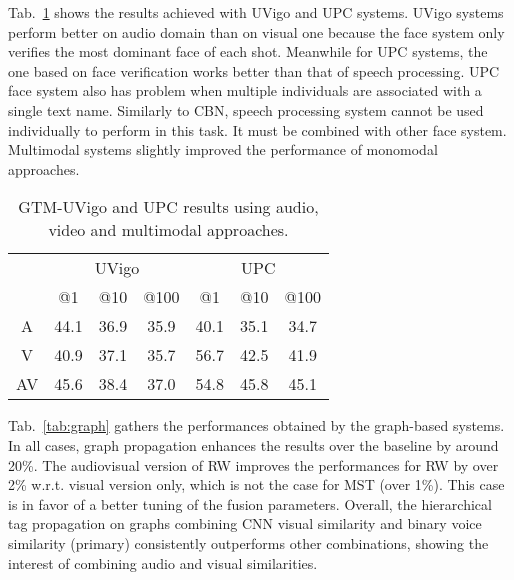  Tab.~\ref{tab:verification} shows the results achieved with UVigo and UPC systems. UVigo systems perform better on audio domain than on visual one because the face system only verifies the most dominant face of each shot.
%
Meanwhile for UPC systems, the one based on face verification works better than that of speech processing. UPC face system also has problem when multiple individuals are associated with a single text name. Similarly to CBN, speech processing system cannot be used individually to perform in this task. It must be combined with other face system.
%
Multimodal systems slightly improved the performance of monomodal approaches.

\begin{table}[tb]
\centering
\caption{GTM-UVigo and UPC results using audio, video and multimodal approaches.}
\vspace*{-2mm}
\begin{tabular}{c|c|c|c|| c|c|c|}
\cline{2-7}
  &  \multicolumn{3}{|c||}{UVigo} &  \multicolumn{3}{|c|}{UPC} \\ \cline{2-7}
           & @1& @10& @100   & @1& @10& @100 \\ \hline
 \multicolumn{1}{|c|}{A} &  44.1  & 36.9   & 35.9  &  40.1  & 35.1   & 34.7\\ \hline
 \multicolumn{1}{|c|}{V} &  40.9  & 37.1   & 35.7 &  56.7  & 42.5   & 41.9 \\ \hline
 \multicolumn{1}{|c|}{AV} & 45.6 & 38.4 & 37.0 & 54.8 & 45.8 & 45.1 \\ \hline
\end{tabular}
%
\vspace*{-5mm}
\label{tab:verification}
\end{table}

 Tab.~\ref{tab:graph} gathers the performances obtained by the graph-based systems. In all cases, graph propagation enhances the results over the baseline by around 20\%. The audiovisual version of RW improves the performances for RW by over 2\% w.r.t. visual version only, which is not the case for MST (over 1\%). This case is in favor of a better tuning of the fusion parameters.
%
Overall, the hierarchical tag propagation on graphs  combining  CNN  visual  similarity  and  binary  voice similarity (primary) consistently outperforms other combinations, showing the interest of combining audio and visual similarities.  


